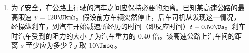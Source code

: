 \documentclass[\gkver]{gaokaozhenti}
\begin{document}
\begin{enumerate}
{$F_1=m_1 a_1$，$F_2=m_2 a_2$ ①

由加速度的定义可知

$a_1=\frac{v_1' - v_1}{t_1}$，$a_2=\frac{v_2' - v_2}{t_2}$ ②

代入上式，可得

$F_1 t_1=m_1(v_1' - v_1)$，$F_2 t_2=m_2(v_2' - v_2)$ ③

根据牛顿第三定律，可知

$F_1=-F_2$；$t_1=t_2$ ④

由③，①可得

$m_1 v_1 + m_2 v_2 = m_1 v_1' + m_2 v_2'$ ⑤

其中 $m_1 v_1$ 和 $m_2 v_2$ 为两质点的初动量，$m_1 v_1'$ 和 $m_2 v_2'$ 为两质点的末动量，这就是动量守恒定律的表达式。

评分标准：本题 12 分。①、②、③各 1 分，④式 2 分，⑤式 3 分。正确、清楚说明每步的根据给 2 分，正确说出式中各符号和结果中各项意义的再给 2 分。
}

\item
为了安全，在公路上行驶的汽车之间应保持必要的距离。已知某高速公路的最高限速 $v = 120\Ukmh$。假设前方车辆突然停止，后车司机从发现这一情况，经操纵刹车，到汽车开始减速所经历的时间（即反应时间）$t = 0.50\Us$。刹车时汽车受到的阻力的大小 $f$ 为汽车重力的 0.40 倍。该高速公路上汽车间的距离 $s$ 至少应为多少？$g$ 取 $10\Umsq$。
\jdanswer{
$156\Um$
}


\end{enumerate}
\end{document}
